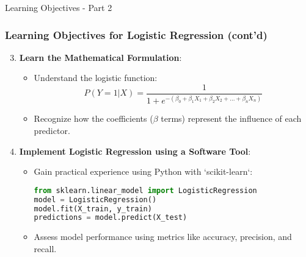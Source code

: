 \documentclass[aspectratio=169]{beamer}
\begin{document}
\begin{frame}[fragile]{Learning Objectives - Part 2}
    \frametitle{Learning Objectives for Logistic Regression (cont'd)}
    \begin{enumerate}
        \setcounter{enumi}{2}
        \item \textbf{Learn the Mathematical Formulation}:
        \begin{itemize}
            \item Understand the logistic function:
            \begin{equation}
            P(Y=1|X) = \frac{1}{1 + e^{-(\beta_0 + \beta_1X_1 + \beta_2X_2 + ... + \beta_nX_n)}}
            \end{equation}
            \item Recognize how the coefficients ($\beta$ terms) represent the influence of each predictor.
        \end{itemize}
        
        \item \textbf{Implement Logistic Regression using a Software Tool}:
        \begin{itemize}
            \item Gain practical experience using Python with `scikit-learn`:
            \begin{lstlisting}[language=Python]
from sklearn.linear_model import LogisticRegression
model = LogisticRegression()
model.fit(X_train, y_train)
predictions = model.predict(X_test)
            \end{lstlisting}
            \item Assess model performance using metrics like accuracy, precision, and recall.
        \end{itemize}
    \end{enumerate}
\end{frame}
\end{document}
